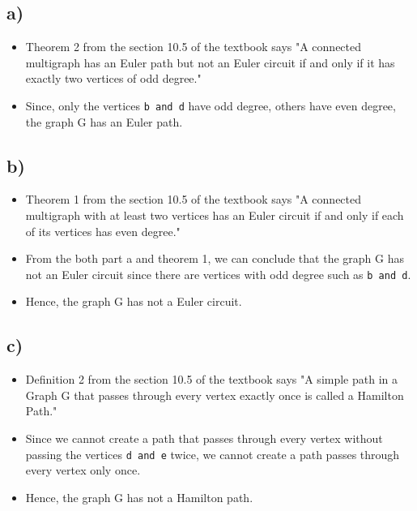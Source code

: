 \documentclass[11pt]{article}
\begin{document}
\subsection*{a)}
    \begin{itemize}
        \item Theorem 2 from the section 10.5 of the textbook says "A connected multigraph has an Euler path but not an Euler circuit if and only if it has exactly
two vertices of odd degree."
        \item Since, only the vertices \texttt{b and d} have odd degree, others have even degree, the graph G has an Euler path.
    \end{itemize}{}
    
\subsection*{b)}
    \begin{itemize}
        \item Theorem 1 from the section 10.5 of the textbook says "A connected multigraph with at least two vertices has an Euler circuit if and only if each of its vertices has even degree."
        \item From the both part a and theorem 1, we can conclude that the graph G has not an Euler circuit since there are vertices with odd degree such as \texttt{b and d}.
        \item Hence, the graph G has not a Euler circuit.
    \end{itemize}{}
    
\subsection*{c)}
    \begin{itemize}
        \item Definition 2 from the section 10.5 of the textbook says "A simple path in a Graph G that passes through every vertex exactly once is called a Hamilton Path."
        \item Since we cannot create a path that passes through every vertex without passing the vertices \texttt{d and e} twice, we cannot create a path passes through every vertex only once.
        \item Hence, the graph G has not a Hamilton path.
    \end{itemize}{}
    
\end{document}
